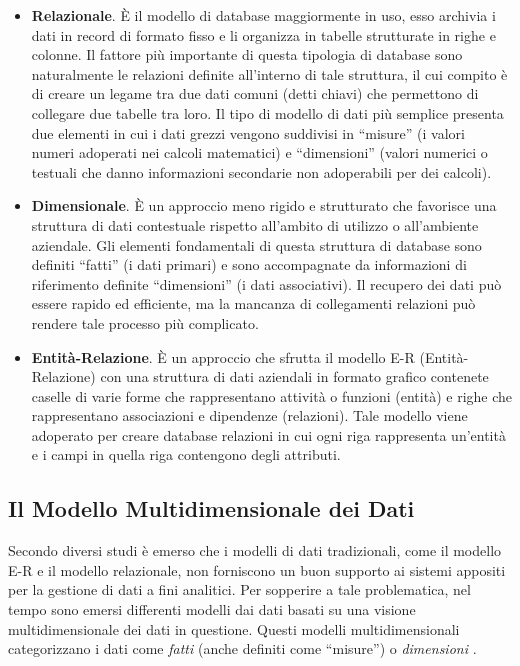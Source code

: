 \begin{itemize}
    \item \textbf{Relazionale}. È il modello di database maggiormente in uso, esso archivia i dati in record di formato fisso e li organizza in tabelle strutturate in righe e colonne. Il fattore più importante di questa tipologia di database sono naturalmente le relazioni definite all'interno di tale struttura, il cui compito è di creare un legame tra due dati comuni (detti chiavi) che permettono di collegare due tabelle tra loro. Il tipo di modello di dati più semplice presenta due elementi in cui i dati grezzi vengono suddivisi in “misure” (i valori numeri adoperati nei calcoli matematici) e “dimensioni” (valori numerici o testuali che danno informazioni secondarie non adoperabili per dei calcoli).
    \item \textbf{Dimensionale}. È un approccio meno rigido e strutturato che favorisce una struttura di dati contestuale rispetto all'ambito di utilizzo o all'ambiente aziendale. Gli elementi fondamentali di questa struttura di database sono definiti “fatti” (i dati primari) e sono accompagnate da informazioni di riferimento definite “dimensioni” (i dati associativi). Il recupero dei dati può essere rapido ed efficiente, ma la mancanza di collegamenti relazioni può rendere tale processo più complicato. 
    \item \textbf{Entità-Relazione}. È un approccio che sfrutta il modello E-R (Entità-Relazione) con una struttura di dati aziendali in formato grafico contenete caselle di varie forme che rappresentano attività o funzioni (entità) e righe che rappresentano associazioni e dipendenze (relazioni). Tale modello viene adoperato per creare database relazioni in cui ogni riga rappresenta un'entità e i campi in quella riga contengono degli attributi.
\end{itemize}


\subsection{Il Modello Multidimensionale dei Dati}

Secondo diversi studi è emerso che i modelli di dati tradizionali, come il modello E-R e il modello relazionale, non forniscono un buon supporto ai sistemi appositi per la gestione di dati a fini analitici. Per sopperire a tale problematica, nel tempo sono emersi differenti modelli dai dati basati su una visione multidimensionale dei dati in questione. Questi modelli multidimensionali categorizzano i dati come \textit{fatti} (anche definiti come “misure”) o \textit{dimensioni} \cite{ieee_multidimensional_data_modeling}.

